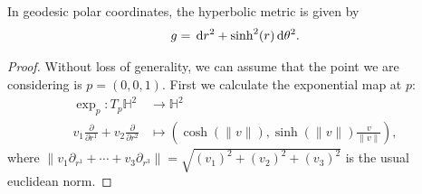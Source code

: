 \documentclass{report}
\begin{document}
    \begin{proposition}
        In geodesic polar coordinates, the hyperbolic metric is given by
        \[
        g = \,\mathrm{d} r^2 + \sinh^2(r) \,\mathrm{d}\theta^2.
        \]
    \end{proposition}
    \begin{proof}
        Without loss of generality, we can assume that the point we are considering is $p = (0,0,1)$.
        First we calculate the exponential map at $p$:
        \begin{align*}
            \exp_p: T_p \mathbb H^2 &\to \mathbb H^2\\
            v_1 \frac{\partial}{\partial r^1} + v_2 \frac{\partial}{\partial r^2} &\mapsto \left(\cosh(\|v\|), \sinh(\|v\|) \frac{v}{\|v\|}\right),
        \end{align*}
        where $\|v_1 \partial_{r^1} + \cdots + v_3 \partial_{r^3}\| = \sqrt{(v_1)^2 + (v_2)^2 + (v_3)^2}$ is the usual euclidean norm.


\end{proof}
\end{document}
